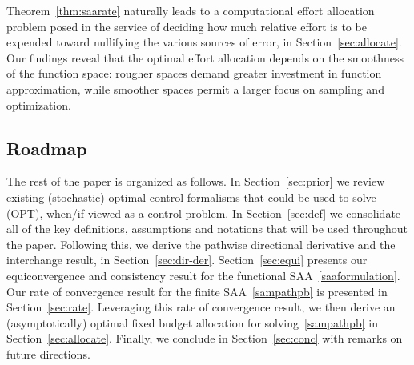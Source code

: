 \documentclass[11pt,leqno]{amsart}
\begin{document}
\begin{enumerate}[leftmargin=*]
Theorem~\ref{thm:saarate} naturally leads to a computational effort allocation problem posed in the service of deciding how much relative effort is to be expended toward nullifying the various sources of error, in Section~\ref{sec:allocate}. Our findings reveal that the optimal effort allocation depends on the smoothness of the function space: rougher spaces demand greater investment in function approximation, while smoother spaces permit a larger focus on sampling and optimization.
\end{enumerate}




\subsection{Roadmap} The rest of the paper is organized as follows. In Section~\ref{sec:prior} we review existing (stochastic) optimal control formalisms that could be used to solve (OPT), when/if viewed as a control problem. In Section~\ref{sec:def} we consolidate all of the key definitions, assumptions and notations that will be used throughout the paper. 
Following this, we derive the pathwise directional derivative and the interchange result, in Section~\ref{sec:dir-der}. Section~\ref{sec:equi} presents our equiconvergence and consistency result for the functional SAA~\eqref{saaformulation}. Our rate of convergence result for the finite SAA~\eqref{sampathpb} is presented in Section~\ref{sec:rate}. Leveraging this rate of convergence result, we then derive an (asymptotically) optimal fixed budget allocation for solving~\eqref{sampathpb} in Section~\ref{sec:allocate}. Finally, we conclude in Section~\ref{sec:conc} with remarks on future directions. %
\end{document}

